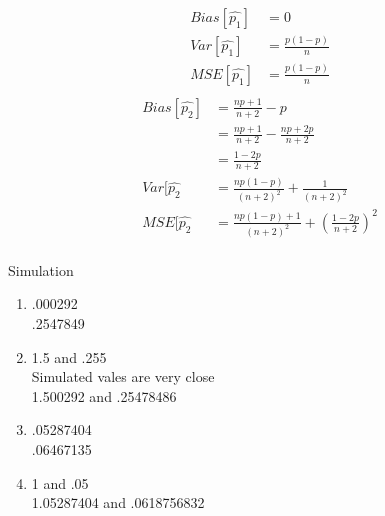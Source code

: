 \documentclass{article}
\begin{document}
\begin{enumerate}
\begin{equation*}
\begin{split}
Bias[\hat{p_{1}}] &= 0 \\
Var[\hat{p_{1}}] &= \frac{p(1-p)}{n} \\
MSE[\hat{p_{1}}] &= \frac{p(1-p)}{n} \\
\end{split}
\end{equation*}
\begin{equation*}
\begin{split}
Bias[\hat{p_{2}}] &= \frac{np+1}{n+2} - p \\
&= \frac{np+1}{n+2} - \frac{np + 2p}{n+2} \\
&= \frac{1-2p}{n+2} \\
Var[\hat{p_{2}} & = \frac{np(1-p)}{(n+2)^{2}}+\frac{1}{(n+2)^{2}} \\
MSE[\hat{p_{2}} &= \frac{np(1-p)+1}{(n+2)^{2}}+(\frac{1-2p}{n+2})^{2} \\
\end{split}
\end{equation*}
\end{enumerate}
Simulation
\begin{enumerate}
\item
.000292\\
.2547849
\item
1.5 and .255\\
Simulated vales are very close\\
1.500292 and .25478486\\
\item
.05287404 \\
.06467135


\item
1 and .05 \\
1.05287404 and .0618756832
\end{enumerate}
\end{document}
